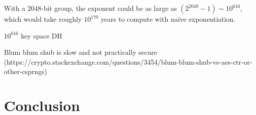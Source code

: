 \documentclass{article}
\begin{document}
With a 2048-bit group, the exponent could be as large as $(2^{2048}-1) \sim 10^{616}$, which would take roughly $10^{170}$ years to compute with naive exponentiation.

$10^{616}$ key space DH

Blum blum shub is slow and not practically secure (https://crypto.stackexchange.com/questions/3454/blum-blum-shub-vs-aes-ctr-or-other-csprngs)

\section{Conclusion}





\end{document}
